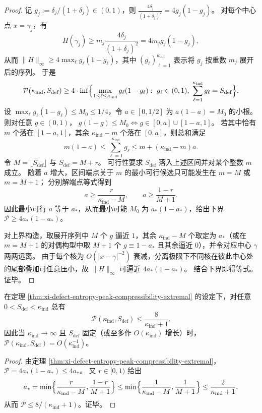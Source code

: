 \begin{proof}
记 \(g_j:=\delta_j/(1+\delta_j)\in(0,1)\)，则
\(
\frac{4\delta_j}{(1+\delta_j)^2}=4g_j(1-g_j)
\)。
对每个中心点 \(x=\gamma_j\)，有
\[
H(\gamma_j)\ge m_j\frac{4\delta_j}{(1+\delta_j)^2}=4m_jg_j(1-g_j),
\]
从而 \(\|H\|_\infty\ge 4\max_\ell g_\ell(1-g_\ell)\)，其中 \((g_\ell)_{\ell=1}^{\kappa_{\mathrm{ind}}}\) 表示将 \(g_j\) 按重数 \(m_j\) 展开后的序列。
于是
\[
\mathcal P(\kappa_{\mathrm{ind}},S_{\mathrm{def}})
\ge
4\cdot \inf\Bigl\{\max_{1\le \ell\le \kappa_{\mathrm{ind}}} g_\ell(1-g_\ell):\ g_\ell\in(0,1),\ \sum_{\ell=1}^{\kappa_{\mathrm{ind}}}g_\ell=S_{\mathrm{def}}\Bigr\}.
\]
设 \(\max_\ell g_\ell(1-g_\ell)\le M_0\le 1/4\)，令 \(a\in[0,1/2]\) 为 \(a(1-a)=M_0\) 的小根。
则对任意 \(g\in(0,1)\)，
\(
g(1-g)\le M_0\iff g\in[0,a]\cup[1-a,1]
\)。
若其中恰有 \(m\) 个落在 \([1-a,1]\)，其余 \(\kappa_{\mathrm{ind}}-m\) 个落在 \([0,a]\)，则总和满足
\[
m(1-a)\le \sum_{\ell=1}^{\kappa_{\mathrm{ind}}}g_\ell \le m+(\kappa_{\mathrm{ind}}-m)a.
\]
令 \(M=\lfloor S_{\mathrm{def}}\rfloor\) 与 \(S_{\mathrm{def}}=M+r\)。
可行性要求 \(S_{\mathrm{def}}\) 落入上述区间并对某个整数 \(m\) 成立。
随着 \(a\) 增大，区间端点关于 \(m\) 的最小可行候选只可能发生在 \(m=M\) 或 \(m=M+1\)；
分别解端点等式得到
\[
a\ge \frac{r}{\kappa_{\mathrm{ind}}-M},
\qquad
a\ge \frac{1-r}{M+1}.
\]
因此最小可行 \(a\) 等于 \(a_\ast\)，从而最小可能 \(M_0\) 为 \(a_\ast(1-a_\ast)\)，给出下界
\(
\mathcal P\ge 4a_\ast(1-a_\ast)
\)。
\par
对上界构造，取展开序列中 \(M\) 个 \(g\) 逼近 \(1\)，其余 \(\kappa_{\mathrm{ind}}-M\) 个取定为 \(a_\ast\)（或在 \(m=M+1\) 的对偶构型中取 \(M+1\) 个 \(g\equiv 1-a_\ast\) 且其余逼近 \(0\)），并令对应中心 \(\gamma\) 两两远离。
由于每个核为 \(O(|x-\gamma|^{-2})\) 衰减，分离极限下不同核在彼此中心处的尾部叠加可任意压小，故 \(\|H\|_\infty\) 可逼近 \(4a_\ast(1-a_\ast)\)。
结合下界即得等式。证毕。
\end{proof}

\begin{corollary}\label{cor:xi-defect-entropy-mass-peak-decoupling}
在定理 \ref{thm:xi-defect-entropy-peak-compressibility-extremal} 的设定下，对任意 \(0<S_{\mathrm{def}}<\kappa_{\mathrm{ind}}\) 总有
\[
\mathcal P(\kappa_{\mathrm{ind}},S_{\mathrm{def}})\le \frac{8}{\kappa_{\mathrm{ind}}+1}.
\]
因此当 \(\kappa_{\mathrm{ind}}\to\infty\) 且 \(S_{\mathrm{def}}\) 固定（或至多作 \(O(\kappa_{\mathrm{ind}})\) 增长）时，\(\mathcal P(\kappa_{\mathrm{ind}},S_{\mathrm{def}})=O(\kappa_{\mathrm{ind}}^{-1})\)。
\end{corollary}
\begin{proof}
由定理 \ref{thm:xi-defect-entropy-peak-compressibility-extremal}，
\(
\mathcal P=4a_\ast(1-a_\ast)\le 4a_\ast
\)。
又 \(r\in[0,1)\) 给出
\[
a_\ast=\min\Bigl\{\frac{r}{\kappa_{\mathrm{ind}}-M},\frac{1-r}{M+1}\Bigr\}
\le \min\Bigl\{\frac{1}{\kappa_{\mathrm{ind}}-M},\frac{1}{M+1}\Bigr\}
\le \frac{2}{\kappa_{\mathrm{ind}}+1},
\]
从而 \(\mathcal P\le 8/(\kappa_{\mathrm{ind}}+1)\)。证毕。
\end{proof}

\endinput
